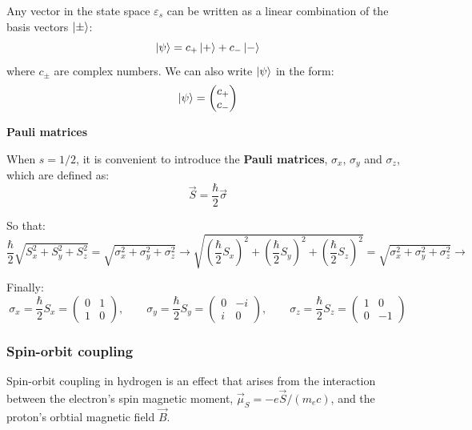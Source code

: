 Any vector in the state space $\varepsilon_s$ can be written as a linear combination of the basis vectors $\ket{\pm}$:
\begin{equation}
    \ket{\psi} = c_+\ket{+} + c_-\ket{-}
\end{equation}
where $c_\pm$ are complex numbers. We can also write $\ket{\psi}$ in the form:
\begin{equation}
    \ket{\psi} = \begin{pmatrix}
        c_+ \\
        c_-
    \end{pmatrix}
\end{equation}

\textbf{Pauli matrices}

When $s=1/2$, it is convenient to introduce the \textbf{Pauli matrices}, $\sigma_x$, $\sigma_y$ and $\sigma_z$, which are defined as:
\begin{equation}
    \vec{S} = \frac{\hbar}{2}\vec{\sigma}
\end{equation}

So that:
\begin{equation}
    \frac{\hbar}{2}\sqrt{S_x^2+S_y^2+S_z^2} = \sqrt{\sigma_x^2+\sigma_y^2+\sigma_z^2}\longrightarrow \sqrt{\left(\frac{\hbar}{2}S_x\right)^2+\left(\frac{\hbar}{2}S_y\right)^2+\left(\frac{\hbar}{2}S_z\right)^2} = \sqrt{\sigma_x^2+\sigma_y^2+\sigma_z^2}\to
\end{equation}

Finally:
\begin{equation}
    \sigma_x = \frac{\hbar}{2}S_x = \begin{pmatrix}
        0 & 1 \\
        1 & 0
    \end{pmatrix}, \qquad \sigma_y = \frac{\hbar}{2}S_y = \begin{pmatrix}
        0 & -i \\
        i & 0
    \end{pmatrix}, \qquad \sigma_z = \frac{\hbar}{2}S_z = \begin{pmatrix}
        1 & 0 \\
        0 & -1
    \end{pmatrix} 
\end{equation}

\subsubsection{Spin-orbit coupling}

Spin-orbit coupling in hydrogen is an effect that arises from the interaction between the electron's spin magnetic moment, $\vec{\mu}_S = -e\vec{S}/(m_ec)$, and the proton's orbtial magnetic field $\vec{B}$.


